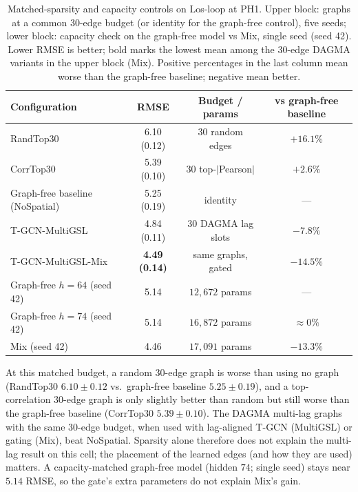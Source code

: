 \begin{table}[t]
\centering
\caption{Matched-sparsity and capacity controls on Los-loop at PH1. Upper block: graphs at a common $30$-edge budget (or identity for the graph-free control), five seeds; lower block: capacity check on the graph-free model vs Mix, single seed (seed 42). Lower RMSE is better; bold marks the lowest mean among the $30$-edge DAGMA variants in the upper block (Mix). Positive percentages in the last column mean worse than the graph-free baseline; negative mean better.}
\label{tab:controls}
\small
\begin{tabular}{lccc}
\toprule
Configuration & RMSE & Budget / params & vs graph-free baseline \\
\midrule
RandTop30 & 6.10 (0.12) & 30 random edges & $+16.1\%$ \\
CorrTop30 & 5.39 (0.10) & 30 top-$|$Pearson$|$ & $+2.6\%$ \\
Graph-free baseline (NoSpatial) & 5.25 (0.19) & identity & --- \\
T-GCN-MultiGSL & 4.84 (0.11) & 30 DAGMA lag slots & $-7.8\%$ \\
T-GCN-MultiGSL-Mix & \textbf{4.49 (0.14)} & same graphs, gated & $-14.5\%$ \\
\midrule
Graph-free $h{=}64$ (seed 42) & 5.14 & $12{,}672$ params & --- \\
Graph-free $h{=}74$ (seed 42) & 5.14 & $16{,}872$ params & $\approx 0\%$ \\
Mix (seed 42) & 4.46 & $17{,}091$ params & $-13.3\%$ \\
\bottomrule
\end{tabular}
\end{table}

At this matched budget, a random $30$-edge graph is worse than using
no graph (RandTop30 $6.10\pm 0.12$ vs.\ graph-free baseline $5.25\pm 0.19$), and a
top-correlation $30$-edge graph is only slightly better than random but
still worse than the graph-free baseline (CorrTop30 $5.39\pm 0.10$). The DAGMA
multi-lag graphs with the same $30$-edge budget, when used with
lag-aligned T-GCN (MultiGSL) or gating (Mix), beat NoSpatial. Sparsity
alone therefore does not explain the multi-lag result on this cell; the
placement of the learned edges (and how they are used) matters. A
capacity-matched graph-free model (hidden $74$; single seed) stays near
$5.14$ RMSE, so the gate's extra parameters do not explain Mix's gain.

